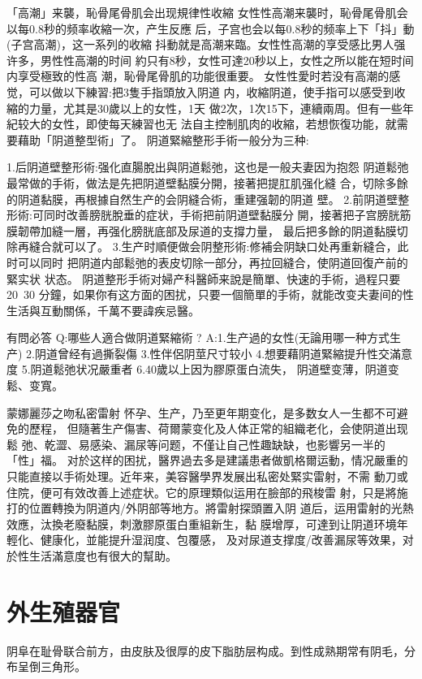 \documentclass[12pt,UTF8]{ctexbook}
\begin{document}
「高潮」来襲，恥骨尾骨肌会出现規律性收縮
女性性高潮来襲时，恥骨尾骨肌会以每0.8秒的频率收縮一次，产生反應
后，子宫也会以每0.8秒的频率上下「抖」動(子宫高潮)，这一系列的收縮
抖動就是高潮来臨。女性性高潮的享受感比男人强许多，男性性高潮的时间
約只有8秒，女性可達20秒以上，女性之所以能在短时间内享受極致的性高
潮，恥骨尾骨肌的功能很重要。
女性性愛时若没有高潮的感觉，可以做以下練習:把3隻手指頭放入阴道
内，收縮阴道，使手指可以感受到收縮的力量，尤其是30歲以上的女性，1天
做2次，1次15下，連續兩周。但有一些年紀较大的女性，即使每天練習也无
法自主控制肌肉的收縮，若想恢復功能，就需要藉助「阴道整型術」了。
阴道緊縮整形手術一般分为三种:

1.后阴道壁整形術:强化直腸脫出與阴道鬆弛，这也是一般夫妻因为抱怨
阴道鬆弛最常做的手術，做法是先把阴道壁黏膜分開，接著把提肛肌强化縫
合，切除多餘的阴道黏膜，再根據自然生产的会阴縫合術，重建强韌的阴道
壁。
2.前阴道壁整形術:可同时改善膀胱脫垂的症状，手術把前阴道壁黏膜分
開，接著把子宫膀胱筋膜韌帶加縫一層，再强化膀胱底部及尿道的支撐力量，
最后把多餘的阴道黏膜切除再縫合就可以了。
3.生产时順便做会阴整形術:修補会阴缺口处再重新縫合，此时可以同时
把阴道内部鬆弛的表皮切除一部分，再拉回縫合，使阴道回復产前的緊实状
状态。
阴道整形手術对婦产科醫師来說是簡單、快速的手術，過程只要20~30
分鐘，如果你有这方面的困扰，只要一個簡單的手術，就能改变夫妻间的性
生活與互動關係，千萬不要諱疾忌醫。

有問必答
Q:哪些人適合做阴道緊縮術 ?
A:1.生产過的女性(无論用哪一种方式生产)
2.阴道曾经有過撕裂傷
3.性伴侶阴莖尺寸较小
4.想要藉阴道緊縮提升性交滿意度
5.阴道鬆弛状况嚴重者
6.40歲以上因为膠原蛋白流失，
阴道壁变薄，阴道变鬆、变寬。

蒙娜麗莎之吻私密雷射
怀孕、生产，乃至更年期变化，是多数女人一生都不可避免的歷程，
但隨著生产傷害、荷爾蒙变化及人体正常的組織老化，会使阴道出现鬆
弛、乾澀、易感染、漏尿等问题，不僅让自己性趣缺缺，也影響另一半的
「性」福。
对於这样的困扰，醫界過去多是建議患者做凱格爾运動，情况嚴重的
只能直接以手術处理。近年来，美容醫學界发展出私密处緊实雷射，不需
動刀或住院，便可有效改善上述症状。它的原理類似运用在臉部的飛梭雷
射，只是將施打的位置轉換为阴道内/外阴部等地方。將雷射探頭置入阴
道后，运用雷射的光熱效應，汰換老廢黏膜，刺激膠原蛋白重組新生，黏
膜增厚，可達到让阴道环境年輕化、健康化，並能提升湿润度、包覆感，
及对尿道支撑度/改善漏尿等效果，对於性生活滿意度也有很大的幫助。

\section{外生殖器官}

阴阜在耻骨联合前方，由皮肤及很厚的皮下脂肪层构成。到性成熟期常有阴毛，分布呈倒三角形。
\end{document}

